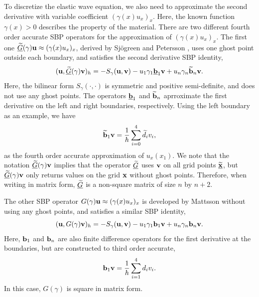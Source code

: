 \documentclass[a4paper]{article}
\newcommand{\wt}{\widetilde}
\begin{document}
To discretize the elastic wave equation, we also need to approximate the second derivative with variable coefficient $(\gamma(x)u_x)_x$. Here, the known function $\gamma(x)>0$ describes the property of the material. There are two different fourth order accurate SBP operators for the approximation of $(\gamma(x)u_x)_x$. The first one $\uline{\wt{G}}(\gamma){\bf u} \approx (\gamma(x)u_x)_x $, derived by Sj\"ogreen and Petersson \cite{?}, uses one ghost point outside each boundary, and satisfies the second derivative SBP identity,
\begin{equation}\label{sbp_2nd_1}
({\bf u}, \uline{\wt{G}}(\gamma){\bf v})_h = -S_\gamma({\bf u},{\bf v})-u_1\gamma_1\uline{\bf b}_1{\bf v} + u_n\gamma_n\wt{\bf b}_n {\bf v}.
\end{equation}
Here, the bilinear form $S_\gamma(\cdot,\cdot)$ is symmetric and positive semi-definite, and does not use any ghost points. The operators $\uline{\bf b}_1$ and $\wt{\bf b}_n$ aprroximate the first derivative on the left and right boundaries, respectively. Using the left boundary as an example, we have 
\begin{equation}\label{sbp_1st_1}
\wt{\bf b}_1 {\bf v} = \frac{1}{h}\sum_{i=0}^{4} \wt{d}_i v_i,
\end{equation}
as the fourth order accurate approximation of $u_x(x_1)$. We note that the notation $\uline{\wt{G}}(\gamma){\bf v}$ implies that the operator $\uline{\wt{G}}$ uses ${\bf v}$ on all grid points $\uline{\wt{{\bf x}}}$, but $\uline{\wt{G}}(\gamma){\bf v}$ only returns values on the grid ${\bf x}$ without ghost points. Therefore, when writing in matrix form, $\uline{\wt{G}}$ is a non-square matrix of size $n$ by $n+2$.

The other SBP operator ${G}(\gamma){\bf u} \approx (\gamma(x)u_x)_x $ is developed by Mattsson \cite{?} without using any ghost points, and satisfies a similar SBP identity,
\begin{equation}\label{sbp_2nd_2}
({\bf u}, G(\gamma){\bf v})_h = -S_\gamma({\bf u},{\bf v})-u_1\gamma_1{\bf b}_1{\bf v} + u_n\gamma_n{\bf b}_n{\bf v}.
\end{equation}
Here, ${\bf b}_1$ and ${\bf b}_n$ are also finite difference operators for the first derivative at the boundaries, but are constructed to third order accurate,
\begin{equation}\label{sbp_1st_2}
{\bf b}_1 {\bf v} = \frac{1}{h}\sum_{i=1}^{4} d_i v_i. 
\end{equation}
In this case, ${G}(\gamma)$ is square in matrix form. 
\end{document}
